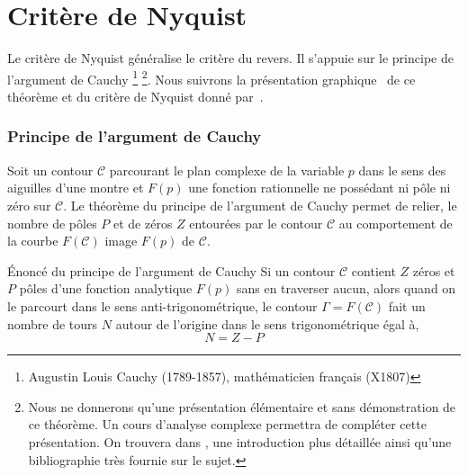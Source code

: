 \section{Critère de Nyquist}

Le critère de Nyquist généralise le critère du revers.
Il s'appuie sur le principe de l'argument de Cauchy
\footnote{Augustin Louis Cauchy (1789-1857), mathématicien français (X1807)}
\footnote{Nous ne donnerons qu'une présentation élémentaire et sans 
démonstration de ce théorème. Un cours d'analyse complexe permettra de 
compléter cette présentation. On trouvera dans \cite{laas_pc7bis,reg}, 
une introduction plus détaillée ainsi qu'une bibliographie très fournie 
sur le sujet.}. Nous suivrons la présentation \og graphique\fg~ de ce théorème 
et du critère de Nyquist donné par~\cite{reg}. 


\subsubsection{Principe de l'argument de Cauchy}

Soit un contour $\mathcal{C}$ parcourant le plan complexe de 
la variable $p$ dans le sens des aiguilles d'une montre et $F(p)$ une fonction 
rationnelle ne possédant ni pôle ni zéro sur $\mathcal{C}$. Le théorème du 
principe de l'argument de Cauchy permet de relier, le nombre de pôles $P$ et 
de zéros $Z$ entourées par le contour $\mathcal{C}$ au comportement de la 
courbe $F(\mathcal{C})$ image $F(p)$ de $\mathcal{C}$.

\begin{theorem}{\'Enoncé du principe de l'argument de Cauchy
    } 
    Si un contour $\mathcal{C}$ contient $Z$ zéros et $P$ pôles d'une fonction 
    analytique $F(p)$ sans en traverser aucun, alors quand on le parcourt dans 
    le sens anti-trigonométrique, le contour $\Gamma=F(\mathcal{C})$ fait un 
    nombre de tours $N$ autour de l'origine dans le sens trigonométrique égal 
    à,
    $$
    N=Z-P
    $$
\end{theorem}

